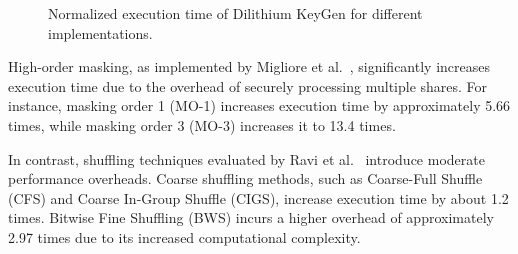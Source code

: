 \begin{figure}[ht]
    \centering
    \caption{Normalized execution time of Dilithium KeyGen for different implementations.}
    \label{fig:keygen_performance}
\end{figure}

High-order masking, as implemented by Migliore et al.~\cite{Migliore19}, significantly increases execution time due to the overhead of securely processing multiple shares. For instance, masking order 1 (MO-1) increases execution time by approximately 5.66 times, while masking order 3 (MO-3) increases it to 13.4 times.

In contrast, shuffling techniques evaluated by Ravi et al.~\cite{Ravi20} introduce moderate performance overheads. Coarse shuffling methods, such as Coarse-Full Shuffle (CFS) and Coarse In-Group Shuffle (CIGS), increase execution time by about 1.2 times. Bitwise Fine Shuffling (BWS) incurs a higher overhead of approximately 2.97 times due to its increased computational complexity.

